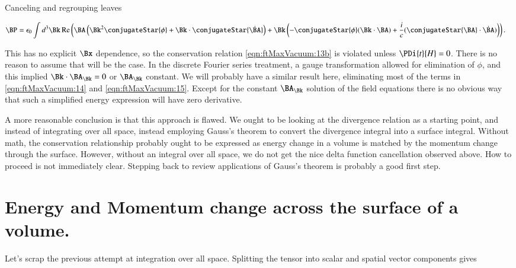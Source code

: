 Canceling and regrouping leaves 

\begin{align}
\label{eqn:ftMaxVacuum:15}
\BP
&=
\epsilon_0 \int d^3 \Bk \Real \left(
\BA \left( \Bk^2 \conjugateStar{\phi} + \Bk \cdot \conjugateStar{\dot{\BA}} \right)
+ \Bk \left( -\conjugateStar{\phi} (\Bk \cdot \BA) + \frac{i}{c} (\conjugateStar{\BA} \cdot \dot{\BA})
\right)
\right).
\end{align}

This has no explicit $\Bx$ dependence, so the conservation relation \autoref{eqn:ftMaxVacuum:13b} is violated unless $\PDi{t}{H} = 0$.  There is no reason to assume that will be the case.  In the discrete Fourier series treatment, a gauge transformation allowed for elimination of $\phi$, and this implied $\Bk \cdot \BA_\Bk = 0$ or $\BA_\Bk$ constant.  We will probably have a similar result here, eliminating most of the terms in \autoref{eqn:ftMaxVacuum:14} and \autoref{eqn:ftMaxVacuum:15}.  Except for the constant $\BA_\Bk$ solution of the field equations there is no obvious way that such a simplified energy expression will have zero derivative.  

A more reasonable conclusion is that this approach is flawed.  We ought to be looking at the divergence relation as a starting point, and instead of integrating over all space, instead employing Gauss's theorem to convert the divergence integral into a surface integral.  Without math, the conservation relationship probably ought to be expressed as energy change in a volume is matched by the momentum change through the surface.  However, without an integral over all space, we do not get the nice delta function cancellation observed above.  How to proceed is not immediately clear.  Stepping back to review applications of Gauss's theorem is probably a good first step.

\section{Energy and Momentum change across the surface of a volume.}

Let's scrap the previous attempt at integration over all space.  Splitting the tensor into scalar and spatial vector components gives

